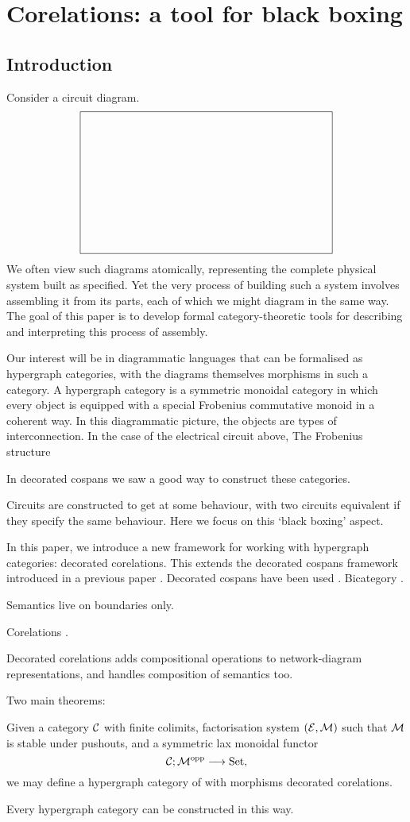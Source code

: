 \chapter{Corelations: a tool for black boxing}

\section{Introduction}

Consider a circuit diagram.
\[
  \begin{tikzpicture}
    \draw (0,0) -- (0,4.5) -- (8,4.5) -- (8,0) -- (0,0);
  \end{tikzpicture}
\]
We often view such diagrams atomically, representing the complete physical
system built as specified. Yet the very process of building such a system
involves assembling it from its parts, each of which we might diagram in the
same way. The goal of this paper is to develop formal category-theoretic tools
for describing and interpreting this process of assembly.

Our interest will be in diagrammatic languages that can be formalised as
hypergraph categories, with the diagrams themselves morphisms in such a
category. A hypergraph category is a symmetric monoidal category in which every
object is equipped with a special Frobenius commutative monoid in a coherent
way. In this diagrammatic picture, the objects are types of interconnection. In
the case of the electrical circuit above, The Frobenius structure

In decorated cospans we saw a good way to construct these categories.

Circuits are constructed to get at some behaviour, with two circuits equivalent
if they specify the same behaviour. Here we focus on this `black boxing' aspect.



In this paper, we introduce a new framework for working with hypergraph
categories: decorated corelations. This extends the decorated cospans framework
introduced in a previous paper \cite{F}. Decorated cospans have been
used \cite{BF, BFP, Po}. Bicategory \cite{Co}.

Semantics live on boundaries only.

Corelations \cite{CF}.

Decorated corelations adds compositional operations to network-diagram
representations, and handles composition of semantics too. 

Two main theorems: 
\begin{theorem}
Given a category $\mathcal C$ with finite colimits, factorisation system $(\mathcal E,\mathcal
M)$ such that $\mathcal M$ is stable under pushouts, and a symmetric lax monoidal functor 
\[
  \mathcal C; \mathcal M^{\mathrm{opp}} \longrightarrow \mathrm{Set},
\]
we may define a hypergraph category of with morphisms decorated corelations.
\end{theorem}
\begin{theorem}
Every hypergraph category can be constructed in this way.
\end{theorem}


